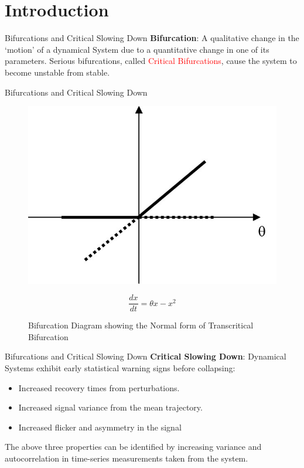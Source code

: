 \section[Introduction]{Introduction}
\label{sec:introduction}

\begin{frame}{Bifurcations and Critical Slowing Down}
	\textbf{Bifurcation}: A qualitative change in the `motion' of a dynamical System due to a quantitative change in one of its parameters. Serious bifurcations, called \textcolor{red}{Critical Bifurcations}, cause the system to become unstable from stable.
\end{frame}

\begin{frame}{Bifurcations and Critical Slowing Down}
	\begin{figure}
		\centering
		\includegraphics[scale=1.00]{figures/transcriticalBifurcation}
		\label{fig:transcritBifurcation}
		\caption{Bifurcation Diagram showing the Normal form of Transcritical Bifurcation}
		\begin{equation}
		\frac{dx}{dt} = \theta x - x^2
		\end{equation}
	\end{figure}
\end{frame}

\begin{frame}{Bifurcations and Critical Slowing Down}
	\textbf{Critical Slowing Down}: Dynamical Systems exhibit early statistical warning signs before collapsing:
	
	\begin{itemize}
		\item Increased recovery times from perturbations.
		\item Increased signal variance from the mean trajectory.
		\item Increased flicker and asymmetry in the signal
	\end{itemize}

The above three properties can be identified by increasing variance and autocorrelation in time-series measurements taken from the system.
\end{frame}
